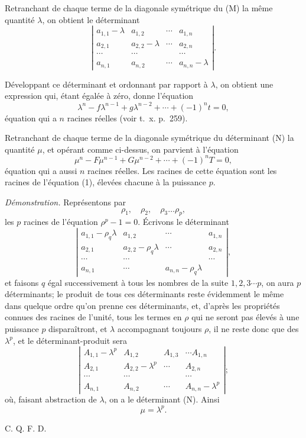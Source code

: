 \documentclass[11pt]{article}
\newcommand{\sourcepage}[1]{\marginpar{\scriptsize p.~#1}}
\begin{document}
Retranchant de chaque terme de la diagonale symétrique du (M) la même quantité $\lambda$, on obtient le déterminant
\[
\left|\begin{array}{cccc}
a_{1,1}-\lambda&a_{1,2}&\cdots&a_{1,n}\\
a_{2,1}&a_{2,2}-\lambda&\cdots&a_{2,n}\\
\cdots&\cdots&&\cdots\\
a_{n,1}&a_{n,2}&\cdots&a_{n,n}-\lambda
\end{array}\right|.
\tag{P}
\]

\sourcepage{365}
Développant ce déterminant et ordonnant par rapport à $\lambda$, on obtient une expression qui, étant égalée à zéro, donne l'équation
\[
\lambda^n-f\lambda^{n-1}+g\lambda^{n-2}+\cdots+(-1)^nt=0,
\tag{1}
\]
équation qui a $n$ racines réelles (voir t.~x. p.~259).

Retranchant de chaque terme de la diagonale symétrique du déterminant (N) la quantité $\mu$, et opérant comme ci-dessus, on parvient à l'équation
\[
\mu^n-F\mu^{n-1}+G\mu^{n-2}+\cdots+(-1)^nT=0,
\tag{2}
\]
équation qui a aussi $n$ racines réelles. Les racines de cette équation sont les racines de l'équation (1), élevées chacune à la puissance $p$.

\emph{Démonstration.} Représentons par
\[
\rho_1,
\quad \rho_2,
\quad \rho_3\ldots\rho_p,
\]
les $p$ racines de l'équation $\rho^p-1=0$. Écrivons le déterminant
\[
\left|\begin{array}{cccc}
a_{1,1}-\rho_q\lambda&a_{1,2}&\cdots&a_{1,n}\\
a_{2,1}&a_{2,2}-\rho_q\lambda&\cdots&a_{2,n}\\
\cdots&\cdots&&\cdots\\
a_{n,1}&\cdots&a_{n,n}-\rho_q\lambda
\end{array}\right|,
\]
et faisons $q$ égal successivement à tous les nombres de la suite $1,2,3\cdots p$, on aura $p$ déterminants; le produit de tous ces déterminants reste évidemment le même dans quelque ordre qu'on prenne ces déterminants, et, d'après les propriétés connues des racines de l'unité, tous les termes en $\rho$ qui ne seront pas élevés à une puissance $p$ disparaîtront, et $\lambda$ accompagnant toujours $\rho$, il ne reste donc que des $\lambda^p$, et le déterminant-produit sera
\[
\left|\begin{array}{cccc}
A_{1,1}-\lambda^p&A_{1,2}&A_{1,3}&\cdots A_{1,n}\\
A_{2,1}&A_{2,2}-\lambda^p&\cdots&A_{2,n}\\
\cdots&\cdots&&\cdots\\
A_{n,1}&A_{n,2}&\cdots&A_{n,n}-\lambda^p
\end{array}\right|;
\tag{Q}
\]
où, faisant abstraction de $\lambda$, on a le déterminant (N). Ainsi
\[
\mu=\lambda^p.
\]
\begin{flushright}C. Q. F. D.\end{flushright}
\end{document}
